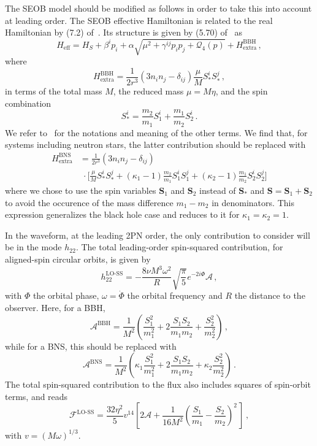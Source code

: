 \documentclass[prd,aps,letter,twocolumn,floatfix,notitlepage,nofootinbib]{revtex4-1}
\newcommand{\be}{\begin{equation}}
\newcommand{\ee}{\end{equation}}
\newcommand{\nnm}{\nonumber}
\newcommand{\mr}{\mathrm}
\newcommand{\tr}{\textrm}
\newcommand{\mc}{\mathcal}
\newcommand{\bs}{\boldsymbol}
\begin{document}
The SEOB model should be modified as follows in order to take this into account at leading order. The SEOB effective Hamiltonian is related to the real Hamiltonian by (7.2) of~\cite{Barausse:2009xi}. Its structure is given by (5.70) of~\cite{Barausse:2009xi} as
\be
H_\mr{eff}=H_S+\beta^ip_i+\alpha\sqrt{\mu^2+\gamma^{ij}p_ip_j+\mc Q_4(p)}+H^\mr{BBH}_\mr{extra} \,,
\ee
where
\be
H^\mr{BBH}_\mr{extra}=\frac{1}{2r^3}(3n_in_j-\delta_{ij})\frac{\mu}{M}S_*^iS_*^j \,,
\ee
in terms of the total mass $M$, the reduced mass $\mu = M \eta$, and the spin combination
\be	
	S_*^i=\frac{m_2}{m_1} S_1^i+\frac{m_1}{m_2}S_2^i \,.
\ee
We refer to~\cite{Barausse:2009xi} for the notations and meaning of the other terms. We find that, for systems including neutron stars, the latter contribution should be replaced with
\begin{align}
	H^\mr{BNS}_\mr{extra} &= \frac{1}{2r^3}(3n_in_j-\delta_{ij}) \nnm\\
	& \; \cdot \bigg[\frac{\mu}{M}S_*^iS_*^j+(\kappa_1-1)\frac{m_2}{m_1}S_1^i S_1^j+(\kappa_2-1)\frac{m_1}{m_2}S_2^i S_2^j\bigg] \label{eq:HBNSextra}
\end{align}
where we chose to use the spin variables $\bs S_1$ and $\bs S_2$ instead of $\bs S_*$ and $\bs S=\bs S_1+\bs S_2$ to avoid the occurence of the mass difference $m_{1} - m_{2}$ in denominators. This expression generalizes the black hole case and reduces to it for $\kappa_{1} = \kappa_{2} = 1$.

In the waveform, at the leading 2PN order, the only contribution to consider will be in the mode $h_{22}$. The total leading-order spin-squared contribution, for aligned-spin circular orbits, is given by~\cite{Kidder:1995zr, Will:1996zj, Buonanno:2012rv}
\be
h_{22}^\tr{LO-SS}=-\frac{8\nu M^3\omega^2}{R}\sqrt{\frac{\pi}{5}}e^{-2i\Phi}\mc A \,,
\ee
with $\Phi$ the orbital phase, $\omega = \dot{\Phi}$ the orbital frequency and $R$ the distance to the observer. Here, for a BBH,
\be\label{eq:ABBH}
\mc A^\mr{BBH}=\frac{1}{M^2}\left(\frac{S_1^2}{m_1^2}+2\frac{S_1S_2}{m_1m_2}+\frac{S_2^2}{m_2^2}\right) \,,
\ee
while for a BNS, this should be replaced with
\be\label{eq:ABNS}
\mc A^\mr{BNS}=\frac{1}{M^2}\left(\kappa_1\frac{S_1^2}{m_1^2}+2\frac{S_1S_2}{m_1m_2}+\kappa_2\frac{S_2^2}{m_2^2}\right) \,.
\ee
The total spin-squared contribution to the flux also includes squares of spin-orbit terms, and reads~\cite{Kidder:1995zr, Will:1996zj, Poisson1998}
\be
\mc F^\tr{LO-SS}=\frac{32\eta^2}{5} v^{14} \left[2\mc A+\frac{1}{16M^2}\left(\frac{S_1}{m_1}-\frac{S_2}{m_2}\right)^2\,\right] \,,
\ee
with $v=(M\omega)^{1/3}$.
\end{document}
